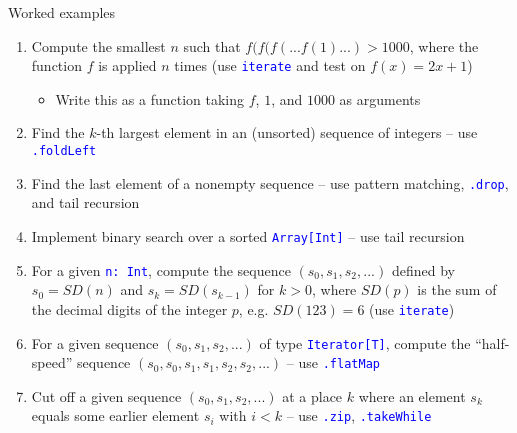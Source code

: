 \documentclass[english]{beamer}
\begin{document}
\begin{frame}{Worked examples}

\begin{enumerate}
\item Compute the smallest $n$ such that $f(f(f(...f(1)...)>1000$, where
the function $f$ is applied $n$ times (use \texttt{\textcolor{blue}{\footnotesize{}iterate}}
and test on $f(x)=2x+1$)
\begin{itemize}
\item Write this as a function taking $f$, $1$, and $1000$ as arguments
\end{itemize}
\item Find the $k$-th largest element in an (unsorted) sequence of integers
-- use \texttt{\textcolor{blue}{\footnotesize{}.foldLeft}}{\footnotesize\par}
\item Find the last element of a nonempty sequence -- use pattern matching,
\texttt{\textcolor{blue}{\footnotesize{}.drop}}, and tail recursion
\item Implement binary search over a sorted \texttt{\textcolor{blue}{\footnotesize{}Array{[}Int{]}}}
-- use tail recursion
\item For a given \texttt{\textcolor{blue}{\footnotesize{}n:\ Int}}, compute
the sequence $\left(s_{0},s_{1},s_{2},...\right)$ defined by $s_{0}=SD(n)$
and $s_{k}=SD(s_{k-1})$ for $k>0$, where $SD(p)$ is the sum of
the decimal digits of the integer $p$, e.g. $SD(123)=6$ (use \texttt{\textcolor{blue}{\footnotesize{}iterate}})
\item For a given sequence $\left(s_{0},s_{1},s_{2},...\right)$ of type
\texttt{\textcolor{blue}{\footnotesize{}Iterator{[}T{]}}}, compute
the ``half-speed'' sequence $\left(s_{0},s_{0},s_{1},s_{1},s_{2},s_{2},...\right)$
-- use \texttt{\textcolor{blue}{\footnotesize{}.flatMap}}{\footnotesize\par}
\item Cut off a given sequence $\left(s_{0},s_{1},s_{2},...\right)$ at
a place $k$ where an element $s_{k}$ equals some earlier element
$s_{i}$ with $i<k$ -- use \texttt{\textcolor{blue}{\footnotesize{}.zip}},
\texttt{\textcolor{blue}{\footnotesize{}.takeWhile}}{\footnotesize\par}
\end{enumerate}
\end{frame}
\end{document}

